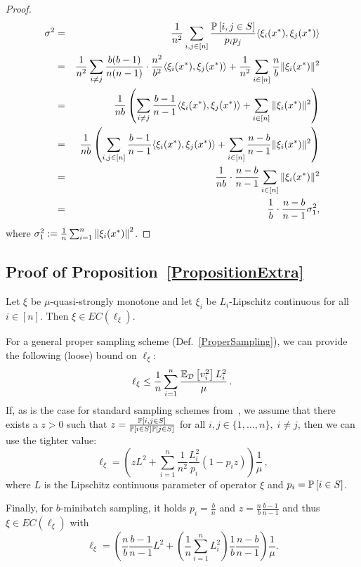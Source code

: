\documentclass{article}
\begin{document}
\begin{proof}
\begin{eqnarray*}
		\sigma^2 &=& \frac{1}{n^2} \sum_{i,j\in [n]} \frac{\mathbb{P} \left[ i,j \in S\right]}{p_ip_j} \langle \xi_i(x^*), \xi_j(x^*) \rangle \\
		&=& \frac{1}{n^2} \sum_{i\neq j} \frac{b(b-1)}{n(n-1)}\cdot \frac{n^2}{b^2} \langle \xi_i(x^*), \xi_j(x^*) \rangle + \frac{1}{n^2} \sum_{i\in [n]} \frac{n}{b} \|\xi_i(x^*)\|^2 \\
		&=& \frac{1}{nb} \left( \sum_{i\neq j} \frac{b-1}{n-1}\langle \xi_i(x^*), \xi_j(x^*) \rangle +  \sum_{i\in [n]} \|\xi_i(x^*)\|^2 \right)\\ 
		&=& \frac{1}{nb} \left( \sum_{i,j\in [n]} \frac{b-1}{n-1}\langle \xi_i(x^*), \xi_j(x^*) \rangle +  \sum_{i\in [n]} \frac{n-b}{n-1}\|\xi_i(x^*)\|^2 \right)\\  
		&=& \frac{1}{nb} \cdot \frac{n-b}{n-1} \sum_{i\in [n]} \|\xi_i(x^*)\|^2\\ 
		&=& \frac{1}{b} \cdot \frac{n-b}{n-1}\sigma_1^2,
	\end{eqnarray*}
where $\sigma_1^2 :=  \frac{1}{n} \sum_{i=1}^n \left\| \xi_i(x^*)\right\|^2$.
\end{proof}

\newpage

\subsection{Proof of Proposition~\ref{PropositionExtra}}

\begin{proposition}
Let $\xi$ be $\mu$-quasi-strongly monotone and let $\xi_i$ be $L_i$-Lipschitz continuous for all $i \in [n]$. Then $\xi  \in EC(\ell_\xi)$.

For a general proper sampling scheme (Def.~\ref{ProperSampling}), we can provide the following (loose) bound on $\ell_\xi$:
\begin{equation} \label{eq:generalSchemeEll}
\ell_\xi \leq \frac{1}{n}\sum_{i=1}^n  \frac{\mathbb{E}_{{\cal D}}\left[v_i^2\right] L_i^2}{\mu} \, .
\end{equation}
If, as is the case for standard sampling schemes from~\citet{gower2019sgd}, we assume that there exists a $z>0$ such that $z=\frac{\mathbb{P} \left[ i,j \in S\right]}{\mathbb{P} \left[ i \in S\right] \mathbb{P} \left[ j \in S\right]}$  for all $i,j \in \{1,\ldots, n\}, \; i\neq j$, then we can use the tighter value:
\begin{equation}
\ell_\xi=\left(z L^2 + \sum_{i=1}^n\frac{1}{n^2} \frac{L_i^2 }{p_i}\left(1 -p_i z \right)  \right) \frac{1}{\mu} \, ,
\end{equation}
where $L$ is the Lipschitz continuous parameter of operator $\xi$ and $p_i =\mathbb{P} \left[ i\in S\right] $. 
 
Finally, for $b$-minibatch sampling, it holds $p_i = \frac{b}{n}$ and $z =\frac{n}{b}\frac{b-1}{n-1}$ and thus $\xi  \in EC(\ell_\xi)$ with
\begin{equation}
\ell_\xi = \left(\frac{n}{b}\frac{b-1}{n-1}L^2+ \left( \frac{1}{n} \sum_{i=1}^n L_i^2 \right)\frac{1}{b}\frac{n-b}{n-1}  \right)\frac{1}{\mu}.
\end{equation}
\end{proposition}
\end{document}

